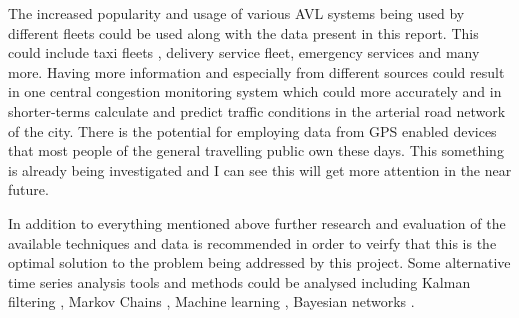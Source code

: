 The increased popularity and usage of various AVL systems being used by different fleets could be used along with the data present in this report. This could include taxi fleets \cite{rahmani2010requirements}, delivery service fleet, emergency services and many more. Having more information and especially from different sources could result in one central congestion monitoring system which could more accurately and in shorter-terms calculate and predict traffic conditions in the arterial road network of the city. There is the potential for employing data from GPS enabled devices that most people of the general travelling public own these days. This something is already being investigated \cite{thiagarajan2010cooperative} and I can see this will get more attention in the near future.

In addition to everything mentioned above further research and evaluation of the available techniques and data is recommended in order to veirfy that this is the optimal solution to the problem being addressed by this project. Some alternative time series analysis tools and methods could be analysed including Kalman filtering \cite{kalmanFiltering} \cite{Guo201450}, Markov Chains \cite{Qi201495} \cite{Ramezani20121576}, Machine learning \cite{herring2010real}, Bayesian networks \cite{Wang201479}.




